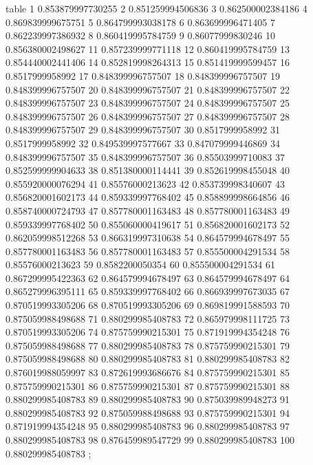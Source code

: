 table {%
	1 0.853879997730255
	2 0.851259994506836
	3 0.862500002384186
	4 0.869839999675751
	5 0.864799993038178
	6 0.863699996471405
	7 0.862239997386932
	8 0.860419995784759
	9 0.86077999830246
	10 0.856380002498627
	11 0.857239999771118
	12 0.860419995784759
	13 0.854440002441406
	14 0.852819998264313
	15 0.851419999599457
	16 0.8517999958992
	17 0.848399996757507
	18 0.848399996757507
	19 0.848399996757507
	20 0.848399996757507
	21 0.848399996757507
	22 0.848399996757507
	23 0.848399996757507
	24 0.848399996757507
	25 0.848399996757507
	26 0.848399996757507
	27 0.848399996757507
	28 0.848399996757507
	29 0.848399996757507
	30 0.8517999958992
	31 0.8517999958992
	32 0.849539997577667
	33 0.847079999446869
	34 0.848399996757507
	35 0.848399996757507
	36 0.85503999710083
	37 0.852599999904633
	38 0.851380000114441
	39 0.852619998455048
	40 0.855920000076294
	41 0.85576000213623
	42 0.853739998340607
	43 0.856820001602173
	44 0.859339997768402
	45 0.858899998664856
	46 0.858740000724793
	47 0.857780001163483
	48 0.857780001163483
	49 0.859339997768402
	50 0.855060000419617
	51 0.856820001602173
	52 0.862059998512268
	53 0.866319997310638
	54 0.864579994678497
	55 0.857780001163483
	56 0.857780001163483
	57 0.855500004291534
	58 0.85576000213623
	59 0.8582200050354
	60 0.855500004291534
	61 0.867299995422363
	62 0.864579994678497
	63 0.864579994678497
	64 0.865279996395111
	65 0.859339997768402
	66 0.866939997673035
	67 0.870519993305206
	68 0.870519993305206
	69 0.869819991588593
	70 0.875059988498688
	71 0.880299985408783
	72 0.865979998111725
	73 0.870519993305206
	74 0.875759990215301
	75 0.871919994354248
	76 0.875059988498688
	77 0.880299985408783
	78 0.875759990215301
	79 0.875059988498688
	80 0.880299985408783
	81 0.880299985408783
	82 0.876019988059997
	83 0.872619993686676
	84 0.875759990215301
	85 0.875759990215301
	86 0.875759990215301
	87 0.875759990215301
	88 0.880299985408783
	89 0.880299985408783
	90 0.875039989948273
	91 0.880299985408783
	92 0.875059988498688
	93 0.875759990215301
	94 0.871919994354248
	95 0.880299985408783
	96 0.880299985408783
	97 0.880299985408783
	98 0.876459989547729
	99 0.880299985408783
	100 0.880299985408783
};
